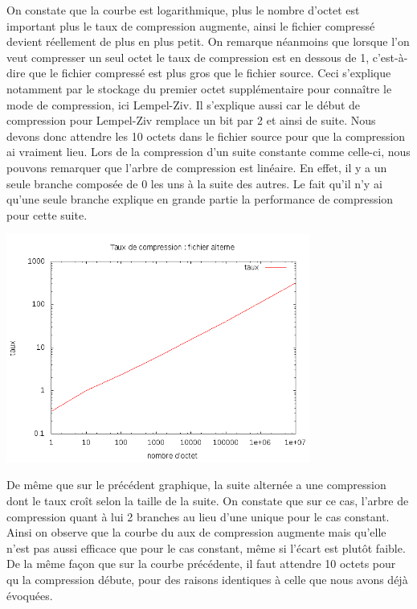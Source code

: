 \documentclass{report}
\begin{document}
On constate que la courbe est logarithmique, plus le nombre d'octet est important plus le taux de compression augmente, ainsi le fichier compressé devient réellement de plus en plus petit. 
On remarque néanmoins que lorsque l'on veut compresser un seul octet le taux de compression est en dessous de 1, c'est-à-dire que le fichier compressé est plus gros que le fichier source. Ceci s'explique notamment par le stockage du premier  octet supplémentaire pour connaître le mode de compression, ici Lempel-Ziv. Il s'explique aussi car le début de compression pour Lempel-Ziv remplace un bit par 2 et ainsi de suite. Nous devons donc attendre les 10 octets dans le fichier source pour que la compression ai vraiment lieu. 
Lors de la compression d'un suite constante comme celle-ci, nous pouvons remarquer que l'arbre de compression est linéaire. En effet, il y a un seule branche composée de 0 les uns à la suite des autres. Le fait qu'il n'y ai qu'une seule branche explique en grande partie la performance de compression pour cette suite. 

\begin{center}
\includegraphics[width=10cm]{LZAlterner.png}
\end{center}

De même que sur le précédent graphique, la suite alternée a une compression dont le taux croît selon la taille de la suite. On constate que sur ce cas, l'arbre de compression quant à lui 2 branches au lieu d'une unique pour le cas constant. Ainsi on observe que la courbe du aux de compression augmente mais qu'elle n'est pas aussi efficace que pour le cas constant, même si l'écart est plutôt faible.
De la même façon que sur la courbe précédente, il faut attendre 10 octets pour qu la compression débute, pour des raisons identiques à celle que nous avons déjà évoquées.  
\end{document}
